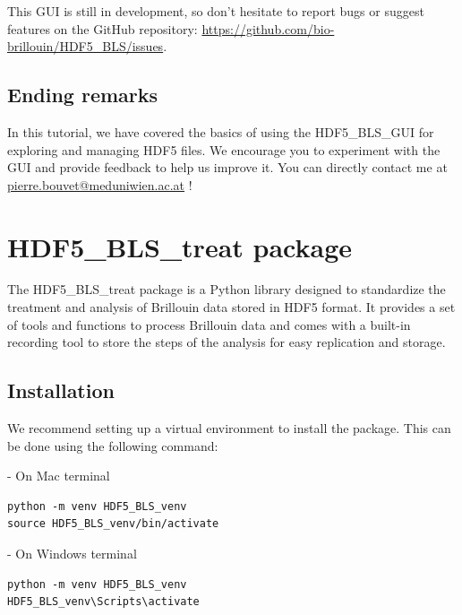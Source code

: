 \documentclass{article}
\begin{document}
This GUI is still in development, so don't hesitate to report bugs or suggest features on the GitHub repository: \url{https://github.com/bio-brillouin/HDF5_BLS/issues}.

\subsection{Ending remarks}

In this tutorial, we have covered the basics of using the HDF5\_BLS\_GUI for exploring and managing HDF5 files. We encourage you to experiment with the GUI and provide feedback to help us improve it. You can directly contact me at \href{mailto:pierre.bouvet@meduniwien.ac.at}{pierre.bouvet@meduniwien.ac.at} !

\vspace{5\baselineskip}

\section{HDF5\_BLS\_treat package}

The HDF5\_BLS\_treat package is a Python library designed to standardize the treatment and analysis of Brillouin data stored in HDF5 format. It provides a set of tools and functions to process Brillouin data and comes with a built-in recording tool to store the steps of the analysis for easy replication and storage.

\subsection{Installation}

We recommend setting up a virtual environment to install the package. This can be done using the following command:

\begin{tcolorbox}[colback=blue!5, colframe=blue!40!black, boxrule=0.5mm, sharp corners, left=2mm, right=2mm, top=1mm, bottom=1mm]
- On Mac terminal
\begin{lstlisting}
python -m venv HDF5_BLS_venv
source HDF5_BLS_venv/bin/activate 
\end{lstlisting}
\end{tcolorbox}

\begin{tcolorbox}[colback=yellow!5, colframe=yellow!40!black, boxrule=0.5mm, sharp corners, left=2mm, right=2mm, top=1mm, bottom=1mm]
- On Windows terminal
\begin{lstlisting}
python -m venv HDF5_BLS_venv
HDF5_BLS_venv\Scripts\activate
\end{lstlisting}
\end{tcolorbox}
\end{document}
